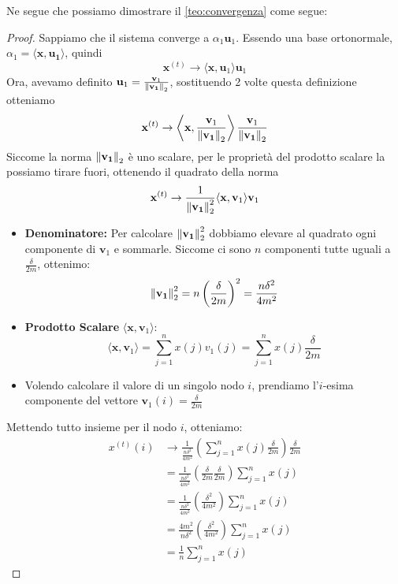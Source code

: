 Ne segue che possiamo dimostrare il \autoref{teo:convergenza} come segue:
\begin{proof}
    Sappiamo che il sistema converge a $\alpha_1\mathbf{u}_1$. Essendo una base ortonormale, $\alpha_1 = \langle \mathbf{x}, \mathbf{u_1} \rangle$, quindi
    \[
        \mathbf{x}^{(t)} \to \langle \mathbf{x}, \mathbf{u}_1 \rangle \mathbf{u}_1
    \]
    Ora, avevamo definito $\mathbf{u}_1 = \frac{\mathbf{v}_1}{\norm{\mathbf{v_1}}_2}$, sostituendo 2 volte questa definizione otteniamo
    \[
        \mathbf{x}^{(t)} \to \left\langle \mathbf{x}, \frac{\mathbf{v}_1}{\norm{\mathbf{v_1}}_2} \right\rangle \frac{\mathbf{v}_1}{\norm{\mathbf{v_1}}_2}
    \]
    Siccome la norma $\norm{\mathbf{v_1}}_2$ è uno scalare, per le proprietà del prodotto scalare la possiamo tirare fuori, ottenendo il quadrato della norma
    \[
        \mathbf{x}^{(t)} \to \frac{1}{\norm{\mathbf{v_1}}_2^2}\langle \mathbf{x}, \mathbf{v}_1 \rangle \mathbf{v}_1
    \]
    \begin{itemize}
        \item \textbf{Denominatore:} Per calcolare $\norm{\mathbf{v_1}}_2^2$ dobbiamo elevare al quadrato ogni componente di $\mathbf{v}_1$ e sommarle. Siccome ci sono $n$ componenti tutte uguali a $\frac{\delta}{2m}$, ottenimo:
        \[
            \norm{\mathbf{v_1}}_2^2 = n \left( \frac{\delta}{2m} \right)^2 = \frac{n\delta^2}{4m^2}
        \]
        \item \textbf{Prodotto Scalare} $\langle \mathbf{x}, \mathbf{v}_1 \rangle$:
        \[
            \langle \mathbf{x}, \mathbf{v}_1 \rangle = \sum_{j = 1}^{n}x(j)v_1(j) = \sum_{j = 1}^{n}x(j)\frac{\delta}{2m}
        \]
        \item Volendo calcolare il valore di un singolo nodo $i$, prendiamo l'$i$-esima componente del vettore $\mathbf{v}_1(i) = \frac{\delta}{2m}$
    \end{itemize}
    Mettendo tutto insieme per il nodo $i$, otteniamo:
    \begin{align*}
        x^{(t)}(i) &\to \frac{1}{\frac{n\delta^2}{4m^2}} \left( \sum_{j = 1}^{n}x(j)\frac{\delta}{2m} \right) \frac{\delta}{2m} \\
        &= \frac{1}{\frac{n\delta^2}{4m^2}} \left( \frac{\delta}{2m} \frac{\delta}{2m} \right) \sum_{j = 1}^{n}x(j) \\
        &= \frac{1}{\frac{n\delta^2}{4m^2}} \left( \frac{\delta^2}{4m^2} \right) \sum_{j = 1}^{n}x(j) \\
        &= \frac{4m^2}{n\delta^2} \left( \frac{\delta^2}{4m^2} \right) \sum_{j = 1}^{n}x(j) \\
        &= \frac{1}{n}\sum_{j = 1}^{n}x(j)
    \end{align*}
\end{proof}

